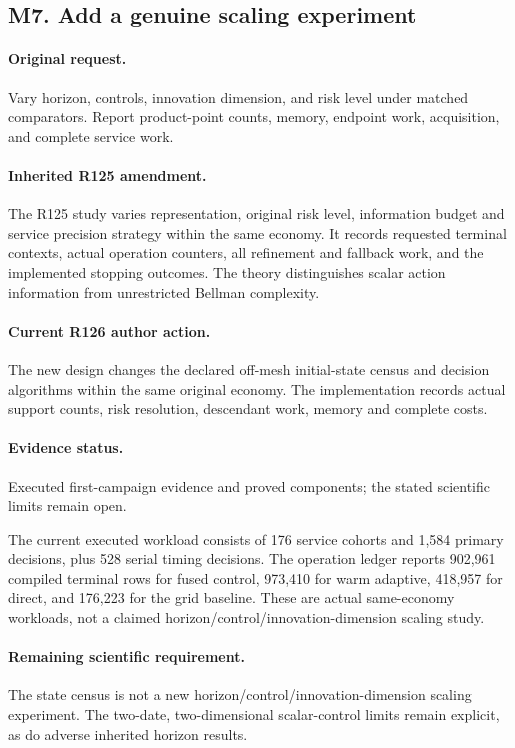 \subsection*{M7. Add a genuine scaling experiment}
\paragraph{Original request.} Vary horizon, controls, innovation dimension, and risk level under matched comparators. Report product-point counts, memory, endpoint work, acquisition, and complete service work.

\paragraph{Inherited R125 amendment.} The R125 study varies representation, original risk level, information budget and service precision strategy within the same economy. It records requested terminal contexts, actual operation counters, all refinement and fallback work, and the implemented stopping outcomes. The theory distinguishes scalar action information from unrestricted Bellman complexity.

\paragraph{Current R126 author action.} The new design changes the declared off-mesh initial-state census and decision algorithms within the same original economy. The implementation records actual support counts, risk resolution, descendant work, memory and complete costs.

\paragraph{Evidence status.} Executed first-campaign evidence and proved components; the stated scientific limits remain open.

The current executed workload consists of 176 service cohorts and 1,584 primary decisions, plus 528 serial timing decisions. The operation ledger reports 902,961 compiled terminal rows for fused control, 973,410 for warm adaptive, 418,957 for direct, and 176,223 for the grid baseline. These are actual same-economy workloads, not a claimed horizon/control/innovation-dimension scaling study.\par

\paragraph{Remaining scientific requirement.} The state census is not a new horizon/control/innovation-dimension scaling experiment. The two-date, two-dimensional scalar-control limits remain explicit, as do adverse inherited horizon results.

